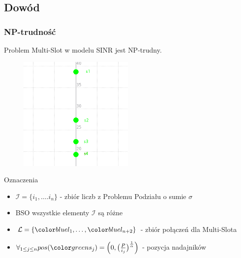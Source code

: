 \documentclass[polish, t,10pt]{beamer}
\begin{document}
\subsection{Dowód}
\begin{frame}
    \frametitle{NP-trudność}
    \begin{theorem}
        Problem Multi-Slot w modelu SINR jest NP-trudny.
    \end{theorem}
    \begin{figure}
        \includegraphics[width=0.5\textwidth]{pictures/np-placement1.png}
    \end{figure}
    \begin{block}{Oznaczenia}
        \begin{itemize}
            \item $\mathcal{I} = \{i_1, \ldots. i_n\}$ - zbiór liczb z Problemu Podziału o sumie $\sigma$
            \item BSO wszystkie elementy $\mathcal{I}$ są różne
            \item $\mathcal{L} = \{\lo, \ldots, \lnt\}$ - zbiór połączeń dla Multi-Slota
            \item $\forall_{1 \leq j \leq n} pos(\sj) = \Big(0, \big(\frac{P}{i_j}\big)^\frac{1}{\alpha}\Big)$ - pozycja nadajników
        \end{itemize}
    \end{block}
\end{frame}
\end{document}
